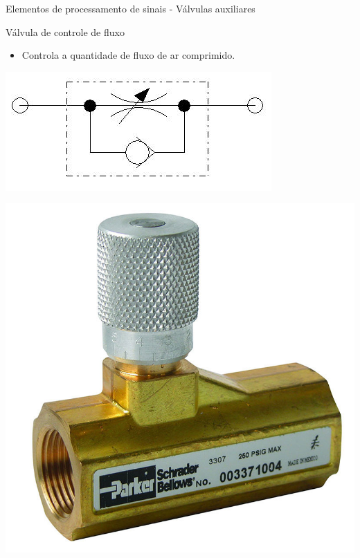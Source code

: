 \begin{frame}{Elementos de processamento de sinais - Válvulas auxiliares}
	\begin{block}{Válvula de controle de fluxo}
		\begin{itemize}
			\item Controla a quantidade de fluxo de ar comprimido.
		\end{itemize}
	\end{block}
	
	\medskip
	
	\begin{minipage}[c]{0.48\linewidth}
		\centering
		\includegraphics[width=1\linewidth]{Figuras/Ch14/fig27}
	\end{minipage}
	\hfill
	\begin{minipage}[c]{0.48\linewidth}
		\centering
		\includegraphics[width=1\linewidth]{Figuras/Ch14/fig28}
	\end{minipage}
\end{frame}


